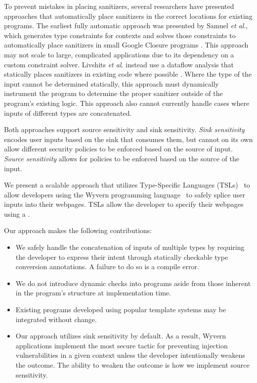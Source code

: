To prevent mistakes in placing sanitizers, several researchers have presented approaches 
that automatically place sanitizers in the correct locations for existing programs. 
The earliest fully automatic approach was presented by Samuel \emph{et al}., which
generates type constraints for contexts and solves those constraints to automatically place
sanitizers in small Google Closure programs \cite{Samuel:2011}. This 
approach may not scale to large, complicated applications due to its dependency on 
a custom constraint solver. Livshits \emph{et al}. instead use a dataflow analysis that
statically places sanitizers in existing code where possible \cite{Livshits:2013}. Where the 
type of the input cannot be determined statically, this approach must dynamically instrument
the program to determine the proper sanitizer outside of the program's existing logic. This
approach also cannot currently handle cases where inputs of different types are concatenated.

Both approaches support source sensitivity and sink sensitivity. \emph{Sink sensitivity} encodes user inputs based on the sink that consumes them, but cannot on its own allow different security policies to be enforced based on the source of input. \emph{Source sensitivity} allows for policies to be enforced based on the source of the input. 

We present a scalable approach that utilizes Type-Specific Languages (TSLs)~\cite{tsl14} to allow developers using the Wyvern programming language~\cite{Nistor:2013}
to safely splice user inputs into their webpages. TSLs allow the developer to
specify their webpages using a .

Our approach makes the following contributions:

\begin{itemize}
\item We safely handle the concatenation of inputs of multiple types by requiring the developer to express their intent through statically checkable type conversion annotations. A failure to do so is a compile error.
\item We do not introduce dynamic checks into programs aside from those inherent in the program's structure at implementation time.
\item Existing programs developed using popular template systems may be integrated without change.
\item Our approach utilizes sink sensitivity by default. As a result, Wyvern applications implement the most secure tactic for preventing injection vulnerabilities in a given context unless the developer intentionally weakens the outcome. The ability to weaken the outcome is how we implement source sensitivity.
\end{itemize}
